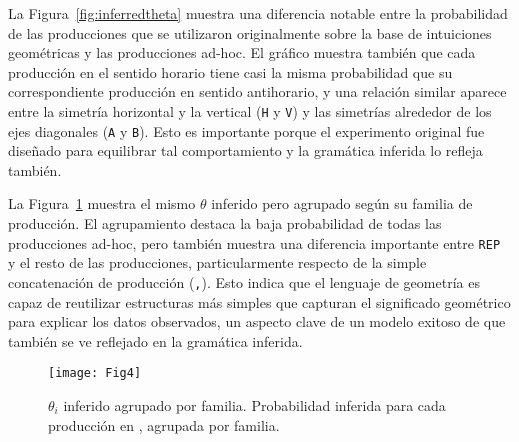 La Figura~\ref{fig:inferredtheta} muestra una diferencia notable entre la probabilidad de las producciones que se utilizaron originalmente sobre la base de intuiciones geométricas y las producciones ad-hoc. El gráfico muestra también que cada producción en el sentido horario tiene casi la misma probabilidad que su correspondiente producción en sentido antihorario, y una relación similar aparece entre la simetría horizontal y la vertical (\verb#H# y \verb#V#) y las simetrías alrededor de los ejes diagonales (\verb#A# y \verb#B#). Esto es importante porque el experimento original fue diseñado para equilibrar tal comportamiento y la gramática inferida lo refleja también.


La Figura~\ref{fig:thetaGrouped} muestra el mismo $\theta$ inferido pero agrupado según su familia de producción. El agrupamiento destaca la baja probabilidad de todas las producciones ad-hoc, pero también muestra una diferencia importante entre \verb#REP# y el resto de las producciones, particularmente respecto de la simple concatenación de producción (\verb#,#). Esto indica que el lenguaje de geometría es capaz de reutilizar estructuras más simples que capturan el significado geométrico para explicar los datos observados, un aspecto clave de un modelo exitoso de \lot que también se ve reflejado en la gramática inferida.

\begin{figure}[!ht]
    \centering
    \texttt{[image: Fig4]}
    \caption{$\theta_i$ inferido agrupado por familia. Probabilidad inferida para cada producción en \gramgeoprima, agrupada por familia.}
    \label{fig:thetaGrouped}
\end{figure}


